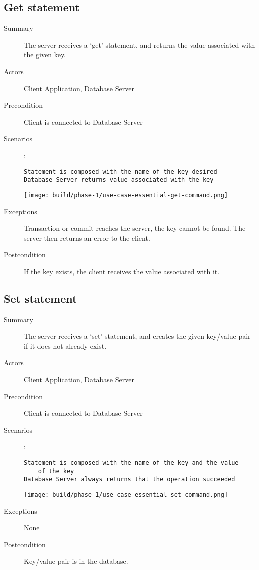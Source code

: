 \documentclass[a4paper]{report}
\begin{document}
	\pagebreak
	
	\subsection{Get statement}

	\begin{description}
		\item[Summary] The server receives a ‘get’ statement, and returns the value associated with the given key.
		\item[Actors] Client Application, Database Server
		\item[Precondition] Client is connected to Database Server
		\item[Scenarios] :

		\begin{lstlisting}
Statement is composed with the name of the key desired
Database Server returns value associated with the key
		\end{lstlisting}

		\begin{center}
			\texttt{[image: build/phase-1/use-case-essential-get-command.png]}
		\end{center}

		\item[Exceptions] Transaction or commit reaches the server, the key cannot be found. The server then returns an error to the client.

		\item[Postcondition] If the key exists, the client receives the value associated with it.
	\end{description}

	\pagebreak
	
	\subsection{Set statement}

	\begin{description}
		\item[Summary] The server receives a ‘set’ statement, and creates the given key/value pair if it does not already exist.
		\item[Actors] Client Application, Database Server
		\item[Precondition] Client is connected to Database Server
		\item[Scenarios] :

		\begin{lstlisting}
Statement is composed with the name of the key and the value
	of the key
Database Server always returns that the operation succeeded
		\end{lstlisting}

		\begin{center}
			\texttt{[image: build/phase-1/use-case-essential-set-command.png]}
		\end{center}

		\item[Exceptions] None
		\item[Postcondition] Key/value pair is in the database.
	\end{description}
	
\end{document}
